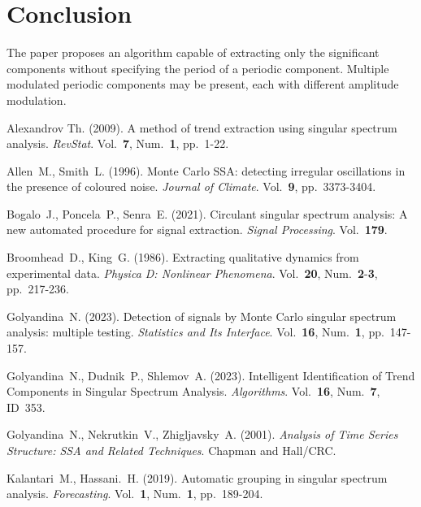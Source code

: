 \documentclass[12pt]{article}
\begin{document}
\section{Conclusion}
The paper proposes an algorithm capable of extracting only the significant components without specifying the period of a periodic component. Multiple modulated periodic components may be present, each with different amplitude modulation.


\begin{thebibliography}{10}

     Alexandrov Th. (2009). A method of trend extraction using singular spectrum analysis. {\sl RevStat}. Vol.~{\bf 7}, Num.~{\bf 1}, pp.~1-22.

     Allen~M., Smith~L. (1996). Monte Carlo SSA: detecting irregular oscillations in the presence of coloured noise. {\sl Journal of Climate}. Vol.~{\bf 9}, pp.~3373-3404.
    
     Bogalo~J., Poncela~P., Senra~E. (2021). Circulant singular spectrum analysis: A new automated procedure for signal extraction. {\sl Signal Processing}. Vol.~{\bf 179}.

     Broomhead~D., King~G. (1986). Extracting qualitative dynamics from experimental data. {\sl Physica D: Nonlinear Phenomena}. Vol.~{\bf 20}, Num.~{\bf 2}-{\bf 3}, pp.~217-236.

     Golyandina~N. (2023). Detection of signals by Monte Carlo singular spectrum analysis: multiple testing. {\sl Statistics and Its Interface}. Vol.~{\bf 16}, Num.~{\bf 1}, pp.~147-157.

     Golyandina~N., Dudnik~P., Shlemov~A. (2023). Intelligent Identification of Trend Components in Singular Spectrum Analysis. {\sl Algorithms}. Vol.~{\bf 16}, Num.~{\bf 7}, ID~353.

     Golyandina~N., Nekrutkin~V., Zhigljavsky~A. (2001). {\sl Analysis of Time Series Structure: SSA and Related Techniques}. Chapman and Hall/CRC.

     Kalantari~M., Hassani.~H. (2019). Automatic grouping in singular spectrum analysis. {\sl Forecasting}. Vol.~{\bf 1}, Num.~{\bf 1}, pp.~189-204.

\end{thebibliography}
\end{document}
